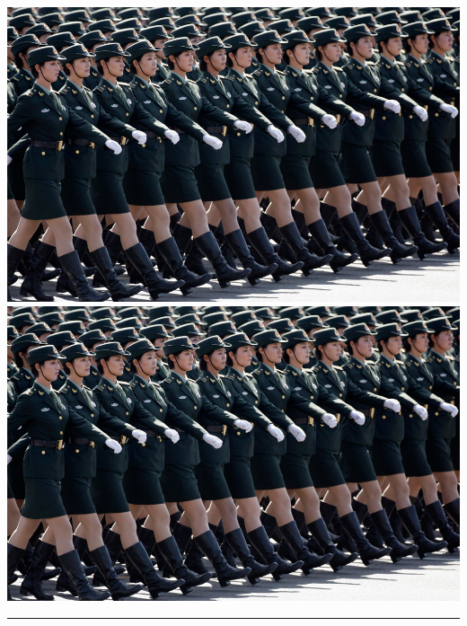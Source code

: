 \documentclass{book}
\makeatletter
\newcommand{\cleartoevenpage}{%
  \clearpage%
  \ifoddpage\c@page\hbox{}\clearpage\fi}
\makeatother
\begin{document}
\cleartoevenpage
\includegraphics{china-05}
\newpage
\hspace*{-\textwidth}\includegraphics{china-05}\hspace{1em}
\parbox[b]{0.3\textwidth}{\lipsum*[1-2]\par \rule{1pt}{160pt}}
\end{document}
